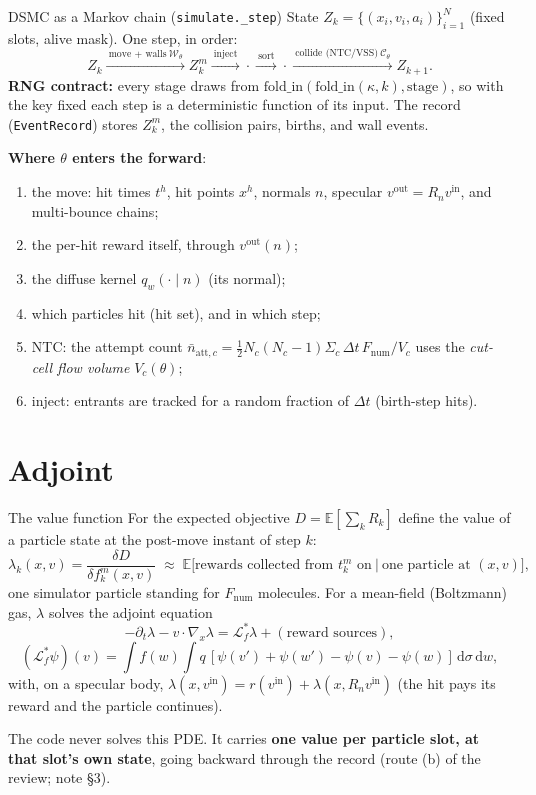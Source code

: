 \documentclass[10pt,aspectratio=169]{beamer}
\newcommand{\E}{\mathbb{E}}
\newcommand{\dd}{\mathrm{d}}
\newcommand{\code}[1]{\texttt{\small #1}}
\begin{document}
\begin{frame}{DSMC as a Markov chain (\code{simulate.\_step})}
State $Z_k = \{(x_i, v_i, a_i)\}_{i=1}^N$ (fixed slots, alive mask).  One step, in order:
\[
Z_k \xrightarrow{\ \text{move + walls}\ \mathcal W_\theta\ } Z_k^{m}
\xrightarrow{\ \text{inject}\ } \cdot
\xrightarrow{\ \text{sort}\ } \cdot
\xrightarrow{\ \text{collide (NTC/VSS)}\ \mathcal C_{\theta}\ } Z_{k+1}.
\]
\textbf{RNG contract:} every stage draws from $\mathrm{fold\_in}(\mathrm{fold\_in}(\kappa, k), \text{stage})$, so
with the key fixed each step is a deterministic function of its input.  The record
(\code{EventRecord}) stores $Z_k^m$, the collision pairs, births, and wall events.

\medskip
\textbf{Where $\theta$ enters the forward}:
\begin{enumerate}
\item[(G1)] the move: hit times $t^h$, hit points $x^h$, normals $n$, specular
  $v^{\mathrm{out}} = R_n v^{\mathrm{in}}$, and multi-bounce chains;
\item[(G2)] the per-hit reward itself, through $v^{\mathrm{out}}(n)$;
\item[(G3)] the diffuse kernel $q_w(\cdot\mid n)$ (its normal);
\item[(G4)] which particles hit (hit set), and in which step;
\item[(G5)] NTC: the attempt count $\bar n_{\mathrm{att},c} = \tfrac12 N_c(N_c-1)\Sigma_c\,\Delta t\,F_{\mathrm{num}}/V_c$
  uses the \emph{cut-cell flow volume} $V_c(\theta)$;
\item[(G6)] inject: entrants are tracked for a random fraction of $\Delta t$ (birth-step hits).
\end{enumerate}
\end{frame}

\section{Adjoint}

\begin{frame}{The value function}
For the expected objective $D = \E[\sum_k R_k]$ define the value
of a particle state at the post-move instant of step $k$:
\[
\lambda_k(x, v) = \frac{\delta D}{\delta f^m_k(x,v)}
\;\approx\; \E\Big[\text{rewards collected from } t_k^m \text{ on}\ \Big|\ \text{one particle at } (x,v)\Big],
\]
one simulator particle standing for $F_{\mathrm{num}}$ molecules.
For a mean-field (Boltzmann) gas, $\lambda$ solves the adjoint equation
\[
-\partial_t\lambda - v\cdot\nabla_x\lambda = \mathcal L^*_f\lambda + (\text{reward sources}),
\]
\[
(\mathcal L^*_f\psi)(v) = \!\int\! f(w)\!\int\! q\,[\psi(v') + \psi(w') - \psi(v) - \psi(w)]\,\dd\sigma\,\dd w ,
\]
with, on a specular body, $\lambda(x, v^{\mathrm{in}}) = r(v^{\mathrm{in}}) + \lambda(x, R_n v^{\mathrm{in}})$
(the hit pays its reward and the particle continues).

\medskip
The code never solves this PDE.  It carries \textbf{one value per particle slot, at that
slot's own state}, going backward through the record (route (b) of the review; note \S3).
\end{frame}
\end{document}

